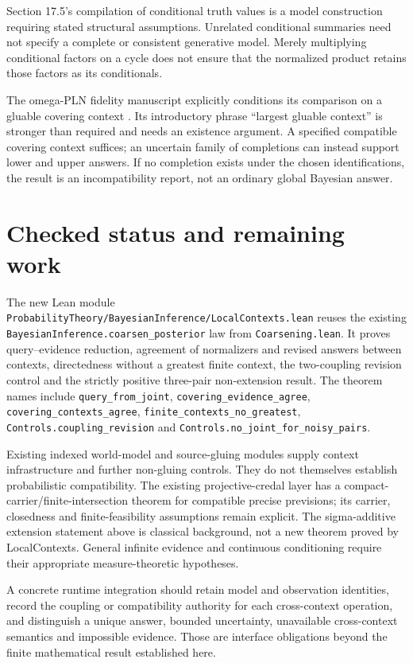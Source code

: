 \documentclass[11pt]{article}
\newcommand{\lean}[1]{\nolinkurl{#1}}
\begin{document}
Section 17.5's compilation of conditional truth values is a model construction
requiring stated structural assumptions. Unrelated conditional summaries need
not specify a complete or consistent generative model. Merely multiplying
conditional factors on a cycle does not ensure that the normalized product
retains those factors as its conditionals.

The omega-PLN fidelity manuscript explicitly conditions its comparison on a
gluable covering context \cite[Section 2.2]{fidelity}. Its introductory phrase
``largest gluable context'' is stronger than required and needs an existence
argument. A specified compatible covering context suffices; an uncertain family
of completions can instead support lower and upper answers. If no completion
exists under the chosen identifications, the result is an incompatibility
report, not an ordinary global Bayesian answer.

\section{Checked status and remaining work}
The new Lean module
\lean{ProbabilityTheory/BayesianInference/LocalContexts.lean} reuses the existing
\lean{BayesianInference.coarsen_posterior} law from \lean{Coarsening.lean}.
It proves query--evidence reduction, agreement of normalizers and revised
answers between contexts, directedness without a greatest finite context,
the two-coupling revision control and the strictly positive three-pair
non-extension result. The theorem names include
\lean{query_from_joint}, \lean{covering_evidence_agree},
\lean{covering_contexts_agree}, \lean{finite_contexts_no_greatest},
\lean{Controls.coupling_revision} and \lean{Controls.no_joint_for_noisy_pairs}.

Existing indexed world-model and source-gluing modules supply context
infrastructure and further non-gluing controls. They do not themselves
establish probabilistic compatibility. The existing projective-credal layer
has a compact-carrier/finite-intersection theorem for compatible precise
previsions; its carrier, closedness and finite-feasibility assumptions remain
explicit. The sigma-additive extension statement above is classical background,
not a new theorem proved by LocalContexts. General infinite evidence and
continuous conditioning require their appropriate measure-theoretic hypotheses.

A concrete runtime integration should retain model and observation identities,
record the coupling or compatibility authority for each cross-context operation,
and distinguish a unique answer, bounded uncertainty, unavailable cross-context
semantics and impossible evidence. Those are interface obligations beyond the
finite mathematical result established here.
\end{document}
